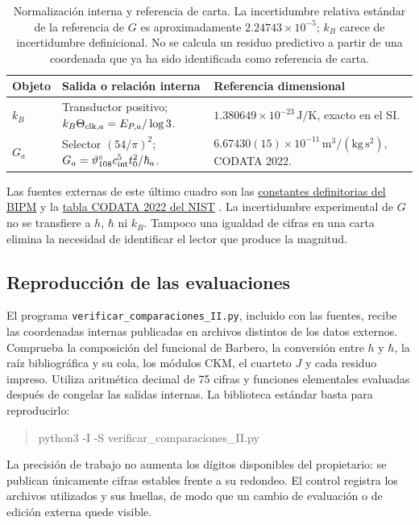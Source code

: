 \begin{table}[htbp]
\centering\small
\begin{tabularx}{\linewidth}{@{}lXX@{}}
\toprule
Objeto & Salida o relación interna & Referencia dimensional\\
\midrule
\(k_B\) & Transductor positivo; \(k_B\Theta_{{\rm clk},a}=E_{P,a}/\log3\).
& \(1.380649\times10^{-23}\,\mathrm{J/K}\), exacto en el SI.\\[4pt]
\(G_a\) & Selector \((54/\pi)^2\); \(G_a=\vartheta_{108}^{\circ}c_{\rm int}^5t_0^2/\hbar_a\).
& \(6.67430(15)\times10^{-11}\,\mathrm{m^3/(kg\,s^2)}\), CODATA 2022.\\
\bottomrule
\end{tabularx}
\caption{Normalización interna y referencia de carta. La incertidumbre
relativa estándar de la referencia de \(G\) es aproximadamente
\(2.24743\times10^{-5}\); \(k_B\) carece de incertidumbre definicional.
No se calcula un residuo predictivo a partir de una coordenada que ya
ha sido identificada como referencia de carta.}
\label{tab:ii-kb-g-cartas}
\end{table}

Las fuentes externas de este último cuadro son las
\href{https://www.bipm.org/en/measurement-units/si-defining-constants}
{constantes definitorias del BIPM} y la
\href{https://physics.nist.gov/cuu/Constants/Table/allascii.txt}
{tabla CODATA 2022 del NIST} \cite{codata2022}.
La incertidumbre experimental de \(G\) no se transfiere a \(h\),
\(\hbar\) ni \(k_B\). Tampoco una igualdad de cifras en una carta
elimina la necesidad de identificar el lector que produce la magnitud.

\subsection{Reproducción de las evaluaciones}

El programa \texttt{verificar\_comparaciones\_II.py}, incluido con las
fuentes, recibe las coordenadas internas publicadas en archivos distintos
de los datos externos. Comprueba la composición del funcional de Barbero,
la conversión entre \(h\) y \(\hbar\), la raíz bibliográfica y su cola,
los módulos CKM, el cuarteto \(J\) y cada residuo impreso. Utiliza
aritmética decimal de 75 cifras y funciones elementales evaluadas después
de congelar las salidas internas. La biblioteca estándar basta para
reproducirlo:
\begin{quote}\small\ttfamily
python3 -I -S verificar\_comparaciones\_II.py
\end{quote}
La precisión de trabajo no aumenta los dígitos disponibles del
propietario: se publican únicamente cifras estables frente a su redondeo.
El control registra los archivos utilizados y sus huellas, de modo que
un cambio de evaluación o de edición externa quede visible.

